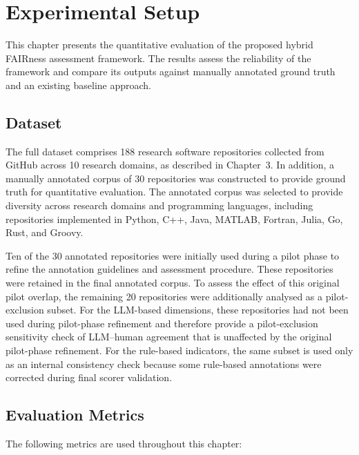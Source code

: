 \section{Experimental Setup}

This chapter presents the quantitative evaluation of the proposed 
hybrid FAIRness assessment framework. The results assess the 
reliability of the framework and compare its outputs against 
manually annotated ground truth and an existing baseline approach.

\subsection{Dataset}

The full dataset comprises 188 research software repositories
collected from GitHub across 10 research domains, as described in
Chapter~3. In addition, a manually annotated corpus of 30 repositories
was constructed to provide ground truth for quantitative evaluation.
The annotated corpus was selected to provide diversity across research
domains and programming languages, including repositories implemented
in Python, C++, Java, MATLAB, Fortran, Julia, Go, Rust, and Groovy.

Ten of the 30 annotated repositories were initially used during a
pilot phase to refine the annotation guidelines and assessment
procedure. These repositories were retained in the final annotated
corpus. To assess the effect of this original pilot overlap, the
remaining 20 repositories were additionally analysed as a
pilot-exclusion subset. For the LLM-based dimensions, these
repositories had not been used during pilot-phase refinement and
therefore provide a pilot-exclusion sensitivity check of LLM--human
agreement that is unaffected by the original pilot-phase refinement.
For the rule-based indicators, the same subset is used
only as an internal consistency check because some rule-based
annotations were corrected during final scorer validation.

\subsection{Evaluation Metrics}

The following metrics are used throughout this chapter:

